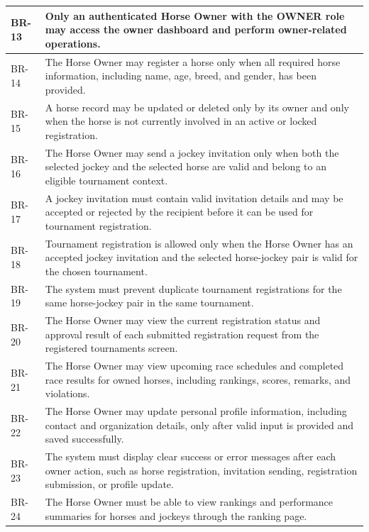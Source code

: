 \vspace{1em}


\begin{table}[H]
    \centering
    \begin{tabular}{|l|p{12cm}|}
        \hline
        BR-13 & Only an authenticated Horse Owner with the OWNER role may access the owner dashboard and perform owner-related operations. \\
        \hline
        BR-14 & The Horse Owner may register a horse only when all required horse information, including name, age, breed, and gender, has been provided. \\
        \hline
        BR-15 & A horse record may be updated or deleted only by its owner and only when the horse is not currently involved in an active or locked registration. \\
        \hline
        BR-16 & The Horse Owner may send a jockey invitation only when both the selected jockey and the selected horse are valid and belong to an eligible tournament context. \\
        \hline
        BR-17 & A jockey invitation must contain valid invitation details and may be accepted or rejected by the recipient before it can be used for tournament registration. \\
        \hline
        BR-18 & Tournament registration is allowed only when the Horse Owner has an accepted jockey invitation and the selected horse-jockey pair is valid for the chosen tournament. \\
        \hline
        BR-19 & The system must prevent duplicate tournament registrations for the same horse-jockey pair in the same tournament. \\
        \hline
        BR-20 & The Horse Owner may view the current registration status and approval result of each submitted registration request from the registered tournaments screen. \\
        \hline
        BR-21 & The Horse Owner may view upcoming race schedules and completed race results for owned horses, including rankings, scores, remarks, and violations. \\
        \hline
        BR-22 & The Horse Owner may update personal profile information, including contact and organization details, only after valid input is provided and saved successfully. \\
        \hline
        BR-23 & The system must display clear success or error messages after each owner action, such as horse registration, invitation sending, registration submission, or profile update. \\
        \hline
        BR-24 & The Horse Owner must be able to view rankings and performance summaries for horses and jockeys through the ranking page. \\
        \hline
    \end{tabular}
    \label{tab:horse_owner_business_rules}
\end{table}

